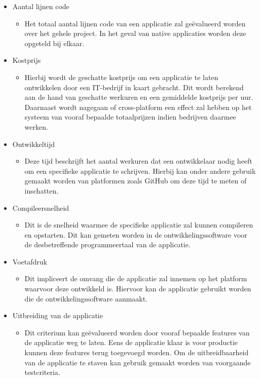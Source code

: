 \begin{itemize}
    \item Aantal lijnen code
    \begin{itemize}
        \item Het totaal aantal lijnen code van een applicatie zal geëvalueerd worden over het gehele project. In het geval van native applicaties worden deze opgeteld bij elkaar.
    \end{itemize}
    \item Kostprijs
    \begin{itemize}
        \item Hierbij wordt de geschatte kostprijs om een applicatie te laten ontwikkelen door een IT-bedrijf in kaart gebracht. Dit wordt berekend aan de hand van geschatte werkuren en een gemiddelde kostprijs per uur. Daarnaast wordt nagegaan of cross-platform een effect zal hebben op het systeem van vooraf bepaalde totaalprijzen indien bedrijven daarmee werken.
    \end{itemize}
    \item Ontwikkeltijd
    \begin{itemize}
        \item Deze tijd beschrijft het aantal werkuren dat een ontwikkelaar nodig heeft om een specifieke applicatie te schrijven. Hierbij kan onder andere gebruik gemaakt worden van platformen zoals GitHub om deze tijd te meten of inschatten.
    \end{itemize}
    \item Compileersnelheid
    \begin{itemize}
        \item Dit is de snelheid waarmee de specifieke applicatie zal kunnen compileren en opstarten. Dit kan gemeten worden in de ontwikkelingssoftware voor de desbetreffende programmeertaal van de applicatie.
    \end{itemize}
    \item Voetafdruk
    \begin{itemize}
        \item Dit impliceert de omvang die de applicatie zal innemen op het platform waarvoor deze ontwikkeld is. Hiervoor kan de applicatie gebruikt worden die de ontwikkelingssoftware aanmaakt.
    \end{itemize}
    \item Uitbreiding van de applicatie
    \begin{itemize}
        \item Dit criterium kan geëvalueerd worden door vooraf bepaalde features van de applicatie weg te laten. Eens de applicatie klaar is voor productie kunnen deze features terug toegevoegd worden. Om de uitbreidbaarheid van de applicatie te staven kan gebruik gemaakt worden van voorgaande testcriteria.
    \end{itemize}
\end{itemize}